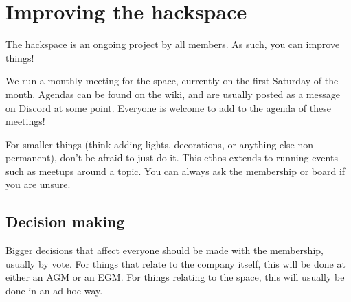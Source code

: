 \documentclass[a5paper,pagesize,10pt,bibtotoc,pointlessnumbers,
normalheadings,DIV=9,twoside=false]{scrbook}
\begin{document}
\section{Improving the hackspace}

The hackspace is an ongoing project by all members.
As such, you can improve things! 

We run a monthly meeting for the space, currently on the first Saturday of the month. 
Agendas can be found on the wiki, and are usually posted as a message on Discord at some point.
Everyone is welcome to add to the agenda of these meetings!

For smaller things (think adding lights, decorations, or anything else non-permanent), don't be afraid to just do it.
This ethos extends to running events such as meetups around a topic.
You can always ask the membership or board if you are unsure.

\subsection{Decision making}

Bigger decisions that affect everyone should be made with the membership, usually by vote.
For things that relate to the company itself, this will be done at either an AGM or an EGM.
For things relating to the space, this will usually be done in an ad-hoc way.

\newpage
\end{document}

